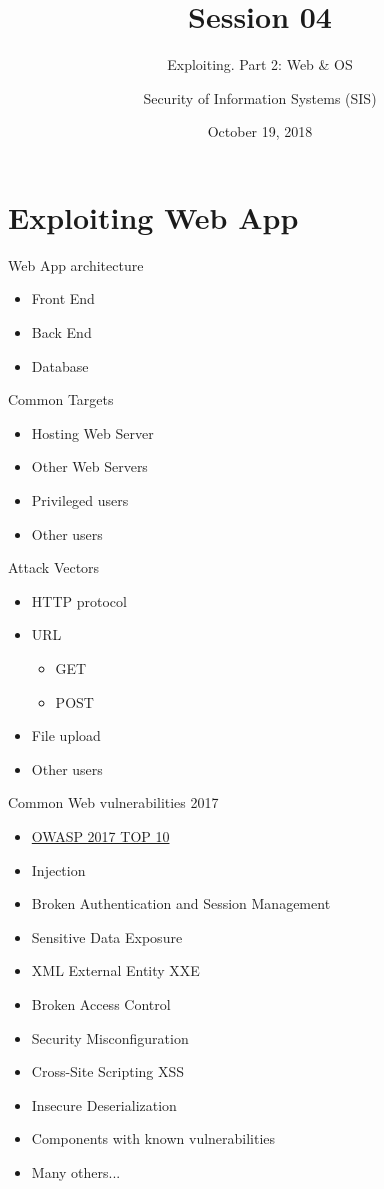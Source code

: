 \documentclass{curs}
\title[Session 04]{Session 04}
\subtitle{Exploiting. Part 2: Web \& OS}
\author{Security of Information Systems (SIS)}
\date{October 19, 2018}
\begin{document}
\frame{\titlepage}

\section{Exploiting Web App}

\begin{frame}{Web App architecture}
  \begin{itemize}
    \item Front End
    \item Back End
    \item Database
  \end{itemize}
\end{frame}

\begin{frame}{Common Targets}
  \begin{itemize}
    \item Hosting Web Server
    \item Other Web Servers
    \item Privileged users
    \item Other users
  \end{itemize}
\end{frame}

\begin{frame}{Attack Vectors}
  \begin{itemize}
    \item HTTP protocol
    \item URL
      \begin{itemize}
        \item GET
        \item POST
      \end{itemize}
    \item File upload
    \item Other users
  \end{itemize}
\end{frame}

\begin{frame}{Common Web vulnerabilities 2017}
  \begin{itemize}
    \item \href{https://github.com/OWASP/Top10/blob/master/2017/}{OWASP 2017 TOP 10}
    \item Injection
    \item Broken Authentication and Session Management
    \item Sensitive Data Exposure
    \item XML External Entity XXE
    \item Broken Access Control
    \item Security Misconfiguration
    \item Cross-Site Scripting XSS
    \item Insecure Deserialization
    \item Components with known vulnerabilities
    \item Many others...
  \end{itemize}
\end{frame}
\end{document}
